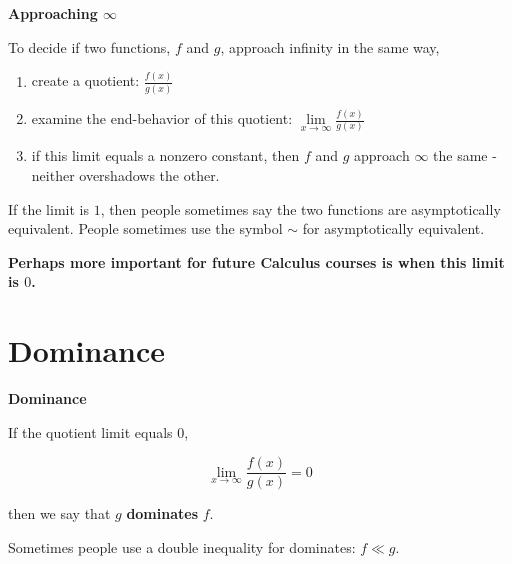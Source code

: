 \documentclass{ximera}
\begin{document}
\begin{idea} \textbf{\textcolor{blue!55!black}{Approaching $\infty$}} 


To decide if two functions, $f$ and $g$, approach infinity in the same way, 

\begin{enumerate}
\item create a quotient: $\frac{f(x)}{g(x)}$ 


\item examine the end-behavior of this quotient: $\lim\limits_{x \to \infty} \frac{f(x)}{g(x)}$ 

\item if this limit equals a nonzero constant, then $f$ and $g$ approach $\infty$ the same - neither overshadows the other.
\end{enumerate}


If the limit is $1$, then people sometimes say the two functions are asymptotically equivalent. People sometimes use the symbol $\sim$ for asymptotically equivalent. 

\end{idea}




\begin{center}

\textbf{\textcolor{purple!85!blue}{Perhaps more important for future Calculus courses is when this limit is $0$.}} 

\end{center}















\section*{Dominance}



\begin{definition}  \textbf{\textcolor{green!50!black}{Dominance}} 

If the quotient limit equals $0$,

\[  \lim_{x \to \infty} \frac{f(x)}{g(x)}  = 0\]

then we say that $g$ \textbf{dominates} $f$. 



Sometimes people use a double inequality for dominates:  $f \ll g$.

\end{definition}
\end{document}
